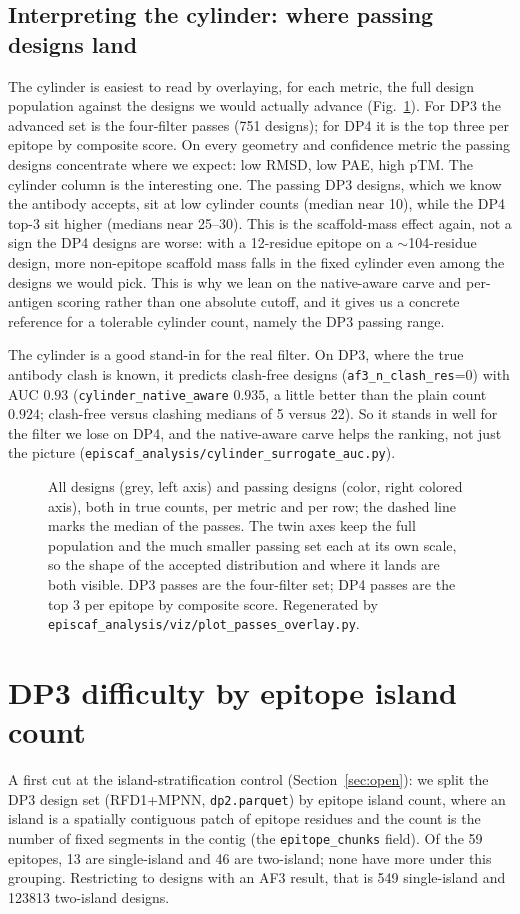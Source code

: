 \subsection{Interpreting the cylinder: where passing designs land}
The cylinder is easiest to read by overlaying, for each metric, the full design population
against the designs we would actually advance (Fig.~\ref{fig:overlay}). For DP3 the advanced
set is the four-filter passes (\num{751} designs); for DP4 it is the top three per epitope by
composite score. On every geometry and confidence metric the passing designs concentrate
where we expect: low RMSD, low PAE, high pTM. The cylinder column is the interesting one. The
passing DP3 designs, which we know the antibody accepts, sit at low cylinder counts (median
near 10), while the DP4 top-3 sit higher (medians near 25--30). This is the scaffold-mass
effect again, not a sign the DP4 designs are worse: with a 12-residue epitope on a
$\sim$104-residue design, more non-epitope scaffold mass falls in the fixed cylinder even
among the designs we would pick. This is why we lean on the native-aware carve and per-antigen
scoring rather than one absolute cutoff, and it gives us a concrete reference for a tolerable
cylinder count, namely the DP3 passing range.

The cylinder is a good stand-in for the real filter. On DP3, where the true antibody clash is
known, it predicts clash-free designs (\texttt{af3\_n\_clash\_res}=0) with AUC $0.93$
(\texttt{cylinder\_native\_aware} $0.935$, a little better than the plain count $0.924$;
clash-free versus clashing medians of 5 versus 22). So it stands in well for the filter we
lose on DP4, and the native-aware carve helps the ranking, not just the picture
(\texttt{episcaf\_analysis/cylinder\_surrogate\_auc.py}).

\begin{figure}[h]\centering
{}
\caption{All designs (grey, left axis) and passing designs (color, right colored axis), both
in true counts, per metric and per row; the dashed line marks the median of the passes. The
twin axes keep the full population and the much smaller passing set each at its own scale, so
the shape of the accepted distribution and where it lands are both visible. DP3 passes are
the four-filter set; DP4 passes are the top 3 per epitope by composite score. Regenerated by
\texttt{episcaf\_analysis/viz/plot\_passes\_overlay.py}.}
\label{fig:overlay}
\end{figure}

\section{DP3 difficulty by epitope island count}\label{sec:islands}
A first cut at the island-stratification control (Section~\ref{sec:open}): we split the DP3
design set (RFD1+MPNN, \texttt{dp2.parquet}) by epitope island count, where an island is a
spatially contiguous patch of epitope residues and the count is the number of fixed segments
in the contig (the \texttt{epitope\_chunks} field). Of the 59 epitopes, 13 are single-island
and 46 are two-island; none have more under this grouping. Restricting to designs with an AF3
result, that is 549 single-island and \num{123813} two-island designs.

